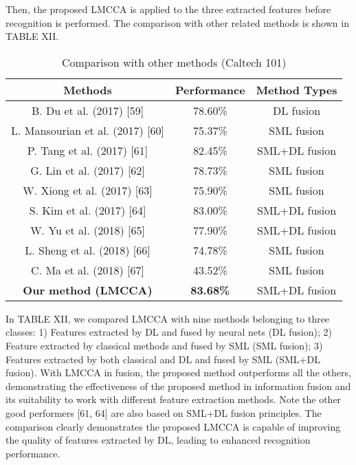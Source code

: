 \documentclass[journal]{IEEEtran}
\begin{document}
Then, the proposed LMCCA is applied to the three extracted features before recognition is performed. The comparison with other related methods is shown in TABLE XII.\\
\vspace*{-10pt}
\begin{table}[h]
\small
\renewcommand{\arraystretch}{1.4}
\caption{\normalsize{Comparison with other methods (Caltech 101)}}
\setlength{\abovecaptionskip}{0pt}
\setlength{\belowcaptionskip}{10pt}
\centering
\tabcolsep 0.07in
\begin{tabular}{ccc}
\hline
Methods & Performance & Method Types\\
\hline
B. Du et al. (2017) [59] &78.60\% & DL fusion\\
L. Mansourian et al. (2017) [60] &75.37\% & SML fusion\\
P. Tang et al. (2017) [61] &82.45\% & SML+DL fusion\\
G. Lin et al. (2017) [62] &78.73\% & SML fusion\\
W. Xiong et al. (2017) [63] &75.90\% & SML fusion\\
S. Kim et al. (2017) [64] &83.00\% & SML+DL fusion\\
W. Yu et al. (2018) [65] &77.90\% & SML+DL fusion\\
L. Sheng et al. (2018) [66] &74.78\% & SML fusion\\
C. Ma et al. (2018) [67] &43.52\% & SML fusion\\
\textbf{Our method (LMCCA)} & \textbf{83.68\%} & SML+DL fusion\\
\hline
\end{tabular}
\end{table}

In TABLE XII, we compared LMCCA with nine methods belonging to three classes: 1) Features extracted by DL and fused by neural nets (DL fusion); 2) Feature extracted by classical methods and fused by SML (SML fusion); 3) Features extracted by both classical and DL and fused by SML (SML+DL fusion). With LMCCA in fusion, the proposed method outperforms all the others, demonstrating the effectiveness of the proposed method in information fusion and its suitability to work with different feature extraction methods. Note the other good performers [61, 64] are also based on SML+DL fusion principles. The comparison clearly demonstrates the proposed LMCCA is capable of improving the quality of features extracted by DL, leading to enhanced recognition performance.
\end{document}
